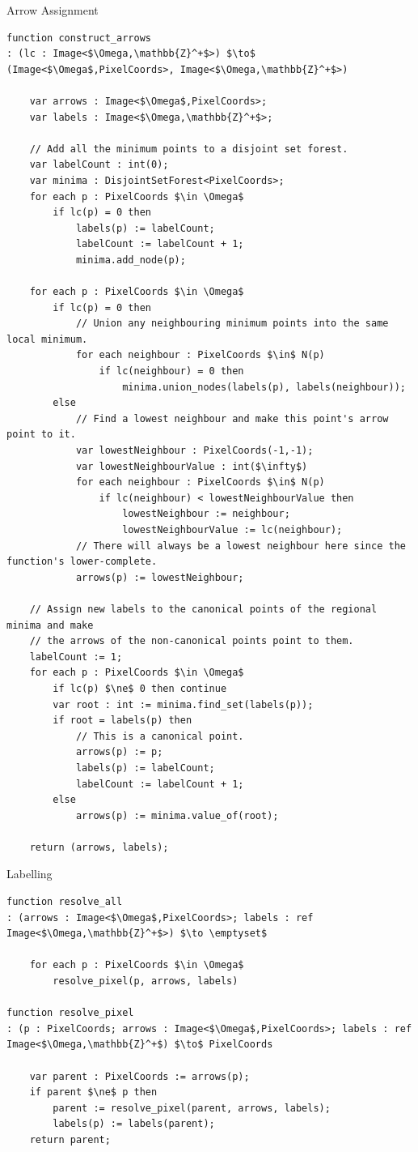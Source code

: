 \begin{stulisting}[p]
\caption{Arrow Assignment}
\label{code:segmentation-watershed-arrowassignment}
\begin{lstlisting}[style=Default]
function construct_arrows
: (lc : Image<$\Omega,\mathbb{Z}^+$>) $\to$ (Image<$\Omega$,PixelCoords>, Image<$\Omega,\mathbb{Z}^+$>)

	var arrows : Image<$\Omega$,PixelCoords>;
	var labels : Image<$\Omega,\mathbb{Z}^+$>;

	// Add all the minimum points to a disjoint set forest.
	var labelCount : int(0);
	var minima : DisjointSetForest<PixelCoords>;
	for each p : PixelCoords $\in \Omega$
		if lc(p) = 0 then
			labels(p) := labelCount;
			labelCount := labelCount + 1;
			minima.add_node(p);

	for each p : PixelCoords $\in \Omega$
		if lc(p) = 0 then
			// Union any neighbouring minimum points into the same local minimum.
			for each neighbour : PixelCoords $\in$ N(p)
				if lc(neighbour) = 0 then
					minima.union_nodes(labels(p), labels(neighbour));
		else
			// Find a lowest neighbour and make this point's arrow point to it.
			var lowestNeighbour : PixelCoords(-1,-1);
			var lowestNeighbourValue : int($\infty$)
			for each neighbour : PixelCoords $\in$ N(p)
				if lc(neighbour) < lowestNeighbourValue then
					lowestNeighbour := neighbour;
					lowestNeighbourValue := lc(neighbour);
			// There will always be a lowest neighbour here since the function's lower-complete.
			arrows(p) := lowestNeighbour;

	// Assign new labels to the canonical points of the regional minima and make
	// the arrows of the non-canonical points point to them.
	labelCount := 1;
	for each p : PixelCoords $\in \Omega$
		if lc(p) $\ne$ 0 then continue
		var root : int := minima.find_set(labels(p));
		if root = labels(p) then
			// This is a canonical point.
			arrows(p) := p;
			labels(p) := labelCount;
			labelCount := labelCount + 1;
		else
			arrows(p) := minima.value_of(root);

	return (arrows, labels);
\end{lstlisting}
\end{stulisting}

\begin{stulisting}[p]
\caption{Labelling}
\label{code:segmentation-watershed-labelling}
\begin{lstlisting}[style=Default]
function resolve_all
: (arrows : Image<$\Omega$,PixelCoords>; labels : ref Image<$\Omega,\mathbb{Z}^+$>) $\to \emptyset$

	for each p : PixelCoords $\in \Omega$
		resolve_pixel(p, arrows, labels)

function resolve_pixel
: (p : PixelCoords; arrows : Image<$\Omega$,PixelCoords>; labels : ref Image<$\Omega,\mathbb{Z}^+$) $\to$ PixelCoords

	var parent : PixelCoords := arrows(p);
	if parent $\ne$ p then
		parent := resolve_pixel(parent, arrows, labels);
		labels(p) := labels(parent);
	return parent;
\end{lstlisting}
\end{stulisting}

